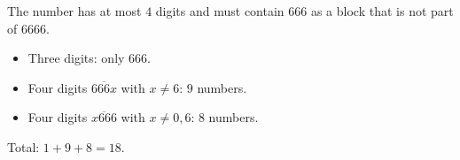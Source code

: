 The number has at most $4$ digits and must contain $666$ as a block that is not part of $6666$.
\begin{itemize}
\item Three digits: only $666$.
\item Four digits $\overline{666x}$ with $x\ne6$: $9$ numbers.
\item Four digits $\overline{x666}$ with $x\ne0,6$: $8$ numbers.
\end{itemize}
Total: $1+9+8=\boxed{18}$.
